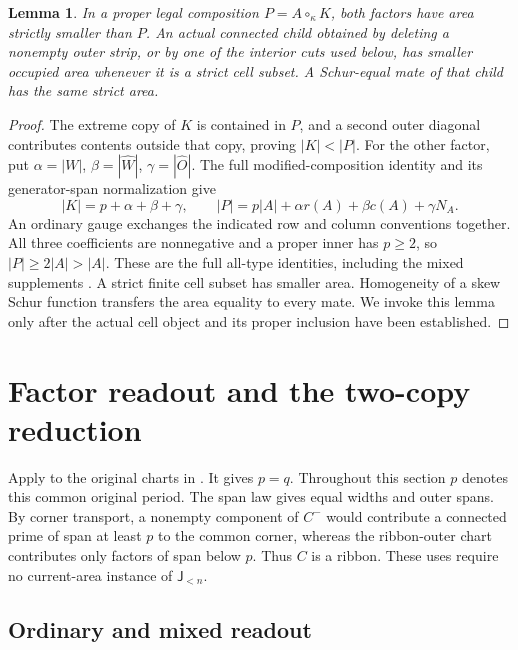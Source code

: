\documentclass[11pt,a4paper]{amsart}
\numberwithin{equation}{section}
\theoremstyle{plain}
\newtheorem{lemma}[theorem]{Lemma}
\theoremstyle{definition}
\newcommand{\Jlower}{\mathsf J_{<n}}
\begin{document}
\begin{lemma}\label{lem:strict-area}
In a proper legal composition \(P=A\circ_\kappa K\), both factors have area strictly smaller than \(P\).  An actual connected child obtained by deleting a nonempty outer strip, or by one of the interior cuts used below, has smaller occupied area whenever it is a strict cell subset.  A Schur-equal mate of that child has the same strict area.
\end{lemma}
\begin{proof}
The extreme copy of \(K\) is contained in \(P\), and a second outer
diagonal contributes contents outside that copy, proving \(|K|<|P|\).
For the other factor, put
\(\alpha=|W|\), \(\beta=|\widehat W|\),
\(\gamma=|\widehat O|\).  The full modified-composition identity and
its generator-span normalization give
\[
 |K|=p+\alpha+\beta+\gamma,\qquad
 |P|=p|A|+\alpha r(A)+\beta c(A)+\gamma N_A.
\]
An ordinary gauge exchanges the indicated row and column conventions
together.  All three coefficients are nonnegative and a proper inner
has \(p\ge2\), so \(|P|\ge2|A|>|A|\).  These are the full all-type
identities, including the mixed supplements
\cite{OlsonHarris2024HopfApplications,Shields2026CornerDescent}.
A strict finite cell subset has smaller area.  Homogeneity of a skew
Schur function transfers the area equality to every mate.  We invoke this
lemma only after the actual cell object and its proper inclusion have
been established.
\end{proof}
\section{Factor readout and the two-copy reduction}\label{sec:reduction}

Apply \cite[Ribbon-outer period rigidity]{Shields2026RibbonPeriod} to
the original charts in .  It gives \(p=q\).
Throughout this section \(p\) denotes this common original period.
The span law gives equal widths and outer spans.  By corner transport,
a nonempty component of \(C^-\) would contribute a connected prime
of span at least \(p\) to the common corner, whereas the ribbon-outer
chart contributes only factors of span below \(p\).  Thus \(C\)
is a ribbon.  These uses require no current-area instance of
\(\Jlower\).

\subsection{Ordinary and mixed readout}
\end{document}

